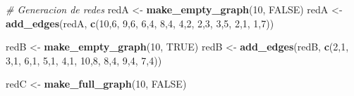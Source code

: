 \documentclass[
]{article}
\newenvironment{Shaded}{\begin{snugshade}}{\end{snugshade}}
\newcommand{\CommentTok}[1]{\textcolor[rgb]{0.56,0.35,0.01}{\textit{#1}}}
\newcommand{\ConstantTok}[1]{\textcolor[rgb]{0.56,0.35,0.01}{#1}}
\newcommand{\DecValTok}[1]{\textcolor[rgb]{0.00,0.00,0.81}{#1}}
\newcommand{\FunctionTok}[1]{\textcolor[rgb]{0.13,0.29,0.53}{\textbf{#1}}}
\newcommand{\NormalTok}[1]{#1}
\newcommand{\OtherTok}[1]{\textcolor[rgb]{0.56,0.35,0.01}{#1}}
\begin{document}
\begin{Shaded}
\begin{Highlighting}[]
\CommentTok{\# Generacion de redes}
\NormalTok{redA }\OtherTok{\textless{}{-}} \FunctionTok{make\_empty\_graph}\NormalTok{(}\DecValTok{10}\NormalTok{, }\ConstantTok{FALSE}\NormalTok{)}
\NormalTok{redA }\OtherTok{\textless{}{-}} \FunctionTok{add\_edges}\NormalTok{(redA, }\FunctionTok{c}\NormalTok{(}\DecValTok{10}\NormalTok{,}\DecValTok{6}\NormalTok{, }\DecValTok{9}\NormalTok{,}\DecValTok{6}\NormalTok{, }\DecValTok{6}\NormalTok{,}\DecValTok{4}\NormalTok{, }\DecValTok{8}\NormalTok{,}\DecValTok{4}\NormalTok{, }\DecValTok{4}\NormalTok{,}\DecValTok{2}\NormalTok{, }\DecValTok{2}\NormalTok{,}\DecValTok{3}\NormalTok{, }\DecValTok{3}\NormalTok{,}\DecValTok{5}\NormalTok{, }\DecValTok{2}\NormalTok{,}\DecValTok{1}\NormalTok{, }\DecValTok{1}\NormalTok{,}\DecValTok{7}\NormalTok{))}

\NormalTok{redB }\OtherTok{\textless{}{-}} \FunctionTok{make\_empty\_graph}\NormalTok{(}\DecValTok{10}\NormalTok{, }\ConstantTok{TRUE}\NormalTok{)}
\NormalTok{redB }\OtherTok{\textless{}{-}} \FunctionTok{add\_edges}\NormalTok{(redB, }\FunctionTok{c}\NormalTok{(}\DecValTok{2}\NormalTok{,}\DecValTok{1}\NormalTok{, }\DecValTok{3}\NormalTok{,}\DecValTok{1}\NormalTok{, }\DecValTok{6}\NormalTok{,}\DecValTok{1}\NormalTok{, }\DecValTok{5}\NormalTok{,}\DecValTok{1}\NormalTok{, }\DecValTok{4}\NormalTok{,}\DecValTok{1}\NormalTok{, }\DecValTok{10}\NormalTok{,}\DecValTok{8}\NormalTok{, }\DecValTok{8}\NormalTok{,}\DecValTok{4}\NormalTok{, }\DecValTok{9}\NormalTok{,}\DecValTok{4}\NormalTok{, }\DecValTok{7}\NormalTok{,}\DecValTok{4}\NormalTok{))}

\NormalTok{redC }\OtherTok{\textless{}{-}} \FunctionTok{make\_full\_graph}\NormalTok{(}\DecValTok{10}\NormalTok{, }\ConstantTok{FALSE}\NormalTok{)}


\end{Highlighting}
\end{Shaded}
\end{document}
